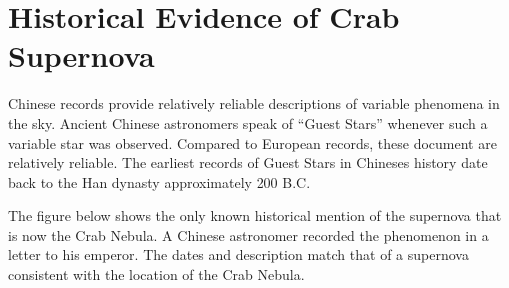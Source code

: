 \section{Historical Evidence of Crab Supernova}
\label{ap:crab}
Chinese records provide relatively reliable 
descriptions of variable phenomena in the sky. Ancient Chinese astronomers speak of \enquote{Guest Stars} 
whenever such a variable star was observed. Compared to European records, these document are relatively reliable. 
The earliest records of Guest Stars in Chineses history date back to the Han dynasty approximately 200 B.C.~\cite{chinese_astro}

The figure below shows the only known historical mention of the supernova that is now the Crab Nebula. 
A Chinese astronomer recorded the phenomenon in a letter to his emperor.
The dates and description match that of a supernova consistent with the 
location of the Crab Nebula.

